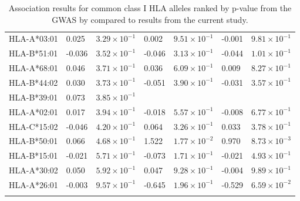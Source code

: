 \documentclass[]{article}
\begin{document}
\begin{doublespace}
\begin{longtable}[H]{p{3cm}p{1cm}p{2cm}p{1cm}p{2cm}p{1cm}p{2cm}}
		HLA-A*03:01 & 0.025 & $3.29 \times 10^{-1}$ & 0.002 & $9.51 \times 10^{-1}$ & -0.001 & $9.81 \times 10^{-1}$ \\ 
		HLA-B*51:01 & -0.036 & $3.52 \times 10^{-1}$ & -0.046 & $3.13 \times 10^{-1}$ & -0.044 & $1.01 \times 10^{-1}$ \\ 
		HLA-A*68:01 & 0.046 & $3.71 \times 10^{-1}$ & 0.036 & $6.09 \times 10^{-1}$ & 0.009 & $8.27 \times 10^{-1}$ \\ 
		HLA-B*44:02 & 0.030 & $3.73 \times 10^{-1}$ & -0.051 & $3.90 \times 10^{-1}$ & -0.031 & $3.57 \times 10^{-1}$ \\ 
		HLA-B*39:01 & 0.073 & $3.85 \times 10^{-1}$ &  &  &  &  \\ 
		HLA-A*02:01 & 0.017 & $3.94 \times 10^{-1}$ & -0.018 & $5.57 \times 10^{-1}$ & -0.008 & $6.77 \times 10^{-1}$ \\ 
		HLA-C*15:02 & -0.046 & $4.20 \times 10^{-1}$ & 0.064 & $3.26 \times 10^{-1}$ & 0.033 & $3.78 \times 10^{-1}$ \\ 
		HLA-B*50:01 & 0.066 & $4.68 \times 10^{-1}$ & 1.522 & $1.77 \times 10^{-2}$ & 0.970 & $8.73 \times 10^{-3}$ \\ 
		HLA-B*15:01 & -0.021 & $5.71 \times 10^{-1}$ & -0.073 & $1.71 \times 10^{-1}$ & -0.021 & $4.93 \times 10^{-1}$ \\ 
		HLA-A*30:02 & 0.050 & $5.92 \times 10^{-1}$ & 0.047 & $9.28 \times 10^{-1}$ & -0.004 & $9.89 \times 10^{-1}$ \\ 
		HLA-A*26:01 & -0.003 & $9.57 \times 10^{-1}$ & -0.645 & $1.96 \times 10^{-1}$ & -0.529 & $6.59 \times 10^{-2}$ \\
		\hline
		\caption{Association results for common class I HLA alleles ranked by p-value from the GWAS by \citet{McLaren2015} compared to results from the current study.}
		\label{tab:full-mclaren-comparison}
\end{longtable}


\end{doublespace}
\end{document}
